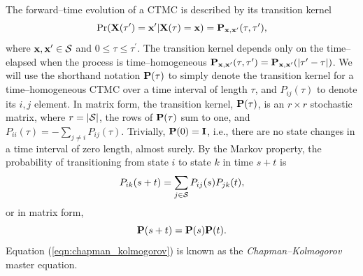 The forward--time evolution of a CTMC is described by its transition kernel $$\Pr(\mathbf{X}(\tau^\prime) = \mathbf{x}^\prime | \mathbf{X}(\tau) = \mathbf{x}) = \mathbf{P}_{\mathbf{x},\mathbf{x}^\prime}(\tau,\tau^\prime),$$
where $ \mathbf{x},\mathbf{x}^\prime\in\mathcal{S} $ and $ 0\leq\tau\leq\tau^\prime $. The transition kernel  depends only on the time--elapsed when the process is time--homogeneous $ \mathbf{P}_{\mathbf{x},\mathbf{x}^\prime}(\tau,\tau^\prime) = \mathbf{P}_{\mathbf{x},\mathbf{x}^\prime}(|\tau^\prime - \tau|)$. We will use the shorthand notation $ \mathbf{P}(\tau) $ to simply denote the transition kernel for a time--homogeneous CTMC over a time interval of length $ \tau $, and $ P_{ij}(\tau) $ to denote its $ i,j $ element. 
In matrix form, the transition kernel, $ \mathbf{P}(\tau) $, is an $ r\times r $ stochastic matrix, where $ r = |\mathcal{S}| $, the rows of $ \mathbf{P}(\tau) $ sum to one, and $ P_{ii}(\tau) = -\sum_{j\neq i}P_{ij}(\tau)$. 
Trivially, $ \mathbf{P}(0) = \mathbf{I} $, i.e., there are no state changes in a time interval of zero length, almost surely. By the Markov property, the probability of transitioning from state $ i $ to state $ k $ in time $ s+t $ is 
\begin{equation}
\label{eqn:chapman_kolmogorov}
P_{ik}(s+t) = \sum_{j\in\mathcal{S}}P_{ij}(s)P_{jk}(t),
\end{equation}
or in matrix form, $$\mathbf{P}(s+t) = \mathbf{P}(s)\mathbf{P}(t).$$
Equation (\ref{eqn:chapman_kolmogorov}) is known as the \textit{Chapman--Kolmogorov} master equation. 

